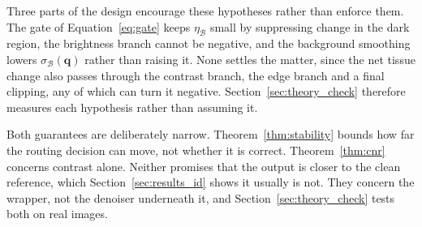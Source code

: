 Three parts of the design encourage these hypotheses rather than enforce them. The gate of
Equation~\eqref{eq:gate} keeps $\eta_\mathcal{B}$ small by suppressing change in the dark region, the
brightness branch cannot be negative, and the background smoothing lowers
$\sigma_\mathcal{B}(\mathbf{q})$ rather than raising it. None settles the matter, since the net tissue change also passes
through the contrast branch, the edge branch and a final clipping, any of which can turn it negative.
Section~\ref{sec:theory_check} therefore measures each hypothesis rather than assuming it.

Both guarantees are deliberately narrow. Theorem~\ref{thm:stability} bounds how far the routing
decision can move, not whether it is correct. Theorem~\ref{thm:cnr} concerns contrast alone. Neither
promises that the output is closer to the clean reference, which Section~\ref{sec:results_id} shows
it usually is not. They concern the wrapper, not the denoiser underneath it, and
Section~\ref{sec:theory_check} tests both on real images.
